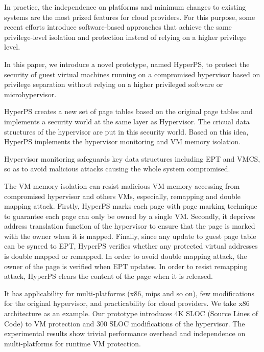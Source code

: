 \documentclass[10pt, numbers, preprint ]{sigplanconf}
\begin{document}
{In practice, the independence on platforms and minimum changes to existing systems are the most prized features for cloud providers. For this purpose, some recent efforts introduce software-based approaches that achieve the same privilege-level isolation and protection instead of relying on a higher privilege level.%

In this paper, we introduce a novel prototype, named HyperPS, to protect the security of guest virtual machines running on a compromised hypervisor based on privilege separation without relying on a higher privileged software or microhypervisor.

HyperPS creates a new set of page tables based on the original page tables and implements a security world at the same layer as Hypervisor. The cricual data structures of the hypervisor are put in this security world. Based on this idea, HyperPS implements the hypervisor monitoring and VM memory isolation.

Hypervisor monitoring safeguards key data structures including EPT and VMCS, so as to avoid malicious attacks causing the whole system compromised.

The VM memory isolation can resist malicious VM memory accessing from compromised hypervisor and others VMs, especially, remapping and double mapping attack. Firstly, HyperPS marks each page with page marking technique to guarantee each page can only be owned by a single VM. Secondly, it deprives address translation function of the hypervisor to ensure that the page is marked with the owner when it is mapped. Finally, since any update to guest page table can be synced to EPT, HyperPS verifies whether any protected virtual addresses is double mapped or remapped. In order to avoid double mapping attack, the owner of the page is verified when EPT updates. In order to resist remapping attack, HyperPS clears the content of the page when it is released.

It has applicability for multi-platforms (x86, mips and so on), few modifications for the original hypervisor, and practicability for cloud providers. We take x86 architecture as an example. Our prototype introduces 4K SLOC (Source Lines of Code) to VM protection and 300 SLOC modifications of the hypervisor. The experimental results show trivial performance overhead and independence on multi-platforms for runtime VM protection.

}
\end{document}
